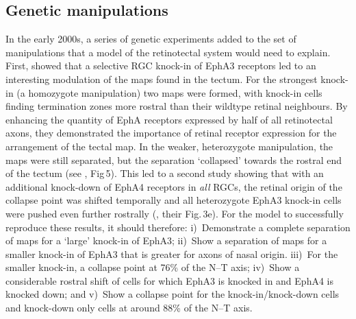 \documentclass[9pt,lineno]{elife}
\begin{document}
\subsection*{Genetic manipulations}

In the early 2000s, a series of genetic experiments added to the set of manipulations that a model of the retinotectal system would need to
explain. 
First, \citet{brown_topographic_2000} showed that a selective RGC knock-in of EphA3 receptors led to an interesting modulation of the maps found in the tectum. 
For the strongest knock-in (a homozygote manipulation) two maps were formed, with knock-in cells finding termination zones more rostral than their wildtype retinal neighbours. 
By enhancing the quantity of EphA receptors expressed by half of all retinotectal axons, they demonstrated the importance of retinal receptor expression for the arrangement of the tectal map. 
In the weaker, heterozygote manipulation, the maps were still separated, but the separation `collapsed' towards the rostral end of the tectum (see \citet{brown_topographic_2000}, Fig\,5). 
This led to a second study showing that with an additional knock-down of EphA4 receptors in \emph{all} RGCs, the retinal origin of the collapse point was shifted temporally and all heterozygote EphA3 knock-in cells were pushed even further rostrally (\citet{reber_relative_2004}, their Fig.\,3e). 
For the model to successfully reproduce these results, it should therefore: i)~Demonstrate a complete separation of maps for a `large' knock-in of EphA3; ii)~Show a separation of maps for a smaller knock-in of EphA3 that is greater for axons of nasal origin. iii)~For the smaller knock-in, a collapse point at 76\% of the N--T axis; iv)~Show a considerable rostral shift of cells for which EphA3 is knocked in and EphA4 is knocked down; and v)~Show a collapse point for the knock-in/knock-down cells and knock-down only cells at around 88\% of the N--T axis.
\end{document}
